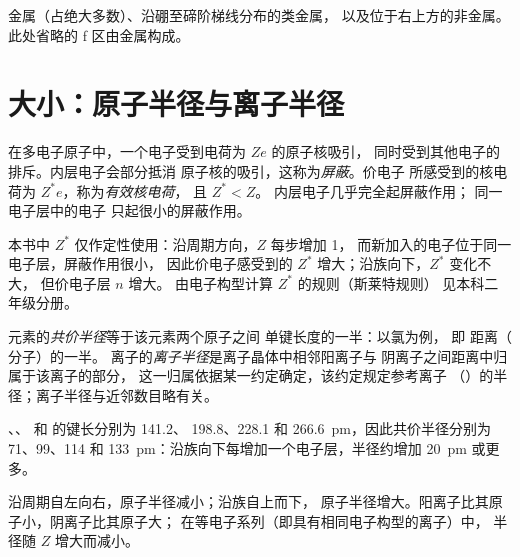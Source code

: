 \begin{omfigure}
\omperiodictable[colour=metals, legend, f block=false]

{\small 金属（占绝大多数）、沿硼至碲阶梯线分布的类金属，
以及位于右上方的非金属。
此处省略的 f 区由金属构成。}
\end{omfigure}

\section{大小：原子半径与离子半径}

\begin{definition}[屏蔽、有效核电荷]\label{def:b1:periodicity:screening}
在多电子原子中，一个电子受到电荷为 $Ze$ 的原子核吸引，
同时受到其他电子的排斥。内层电子会部分抵消
原子核的吸引，这称为\emph{屏蔽}。价电子
所感受到的核电荷为 $Z^{*}e$，称为\emph{有效核电荷}，
且 $Z^{*} < Z$。
内层电子几乎完全起屏蔽作用；
同一电子层中的电子
只起很小的屏蔽作用。
\end{definition}

\begin{remark}[定性工具]\label{rem:b1:periodicity:slater}
本书中 $Z^{*}$ 仅作定性使用：沿周期方向，$Z$ 每步增加 1，
而新加入的电子位于同一电子层，屏蔽作用很小，
因此价电子感受到的 $Z^{*}$ 增大；沿族向下，$Z^{*}$ 变化不大，
但价电子层 $n$ 增大。
由电子构型计算 $Z^{*}$ 的规则（斯莱特规则）
见本科二年级分册。
\end{remark}

\begin{definition}\label{def:b1:periodicity:radius}
元素的\emph{共价半径}等于该元素两个原子之间
单键长度的一半：以氯为例，
即  距离（ 分子）的一半。
离子的\emph{离子半径}是离子晶体中相邻阳离子与
阴离子之间距离中归属于该离子的部分，
这一归属依据某一约定确定，该约定规定参考离子
（）的半径；离子半径与近邻数目略有关。
\end{definition}

\begin{example}[卤素]\label{ex:b1:periodicity:halogen-radii}
、、 和  的键长分别为 141.2、
198.8、228.1 和 \qty{266.6}{pm}，因此共价半径分别为 71、99、114
和 \qty{133}{pm}：沿族向下每增加一个电子层，半径约增加
\qty{20}{pm} 或更多。
\end{example}

\begin{proposition}[半径的变化趋势]\label{prop:b1:periodicity:radius-trend}
沿周期自左向右，原子半径减小；沿族自上而下，
原子半径增大。阳离子比其原子小，阴离子比其原子大；
在等电子系列（即具有相同电子构型的离子）中，
半径随 $Z$ 增大而减小。
\end{proposition}


